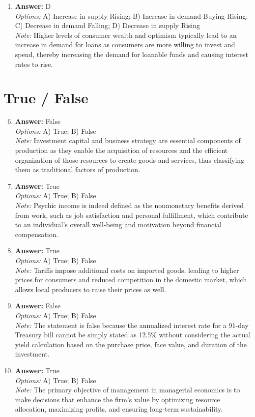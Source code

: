 \documentclass[12pt]{article}
\begin{document}
\begin{enumerate}[label=\arabic*.]
\item \textbf{Answer:} D
\\ \textit{Options:} A) Increase in supply Rising; B) Increase in demand Buying Rising; C) Decrease in demand Falling; D) Decrease in supply Rising
\\ \textit{Note:} Higher levels of consumer wealth and optimism typically lead to an increase in demand for loans as consumers are more willing to invest and spend, thereby increasing the demand for loanable funds and causing interest rates to rise.
\end{enumerate}

\section*{True / False}
\begin{enumerate}[label=\arabic*.]
\setcounter{enumi}{5}
\item \textbf{Answer:} False
\\ \textit{Options:} A) True; B) False
\\ \textit{Note:} Investment capital and business strategy are essential components of production as they enable the acquisition of resources and the efficient organization of those resources to create goods and services, thus classifying them as traditional factors of production.
\item \textbf{Answer:} True
\\ \textit{Options:} A) True; B) False
\\ \textit{Note:} Psychic income is indeed defined as the nonmonetary benefits derived from work, such as job satisfaction and personal fulfillment, which contribute to an individual's overall well-being and motivation beyond financial compensation.
\item \textbf{Answer:} True
\\ \textit{Options:} A) True; B) False
\\ \textit{Note:} Tariffs impose additional costs on imported goods, leading to higher prices for consumers and reduced competition in the domestic market, which allows local producers to raise their prices as well.
\item \textbf{Answer:} False
\\ \textit{Options:} A) True; B) False
\\ \textit{Note:} The statement is false because the annualized interest rate for a 91-day Treasury bill cannot be simply stated as 12.5\% without considering the actual yield calculation based on the purchase price, face value, and duration of the investment.
\item \textbf{Answer:} True
\\ \textit{Options:} A) True; B) False
\\ \textit{Note:} The primary objective of management in managerial economics is to make decisions that enhance the firm's value by optimizing resource allocation, maximizing profits, and ensuring long-term sustainability.
\end{enumerate}
\end{document}
